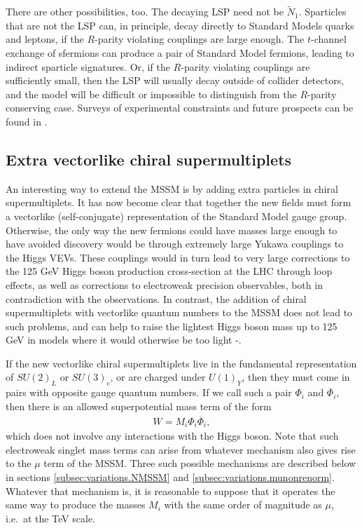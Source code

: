 \documentclass[11pt]{article}
\def\beq{\begin{eqnarray}}
\def\eeq{\end{eqnarray}}
\def\stilde{\widetilde}
\def\NI{\stilde N_1}
\begin{document}
There are other possibilities, too.  The decaying LSP need not be $\NI$.
Sparticles that are not the LSP can, in principle, decay directly to
Standard Models quarks and leptons, if the $R$-parity violating couplings
are large enough. The $t$-channel exchange of sfermions can produce a pair
of Standard Model fermions, leading to indirect sparticle signatures.
Or, if the $R$-parity violating couplings are sufficiently small, then the
LSP will usually decay outside of collider detectors, and the model will
be difficult or impossible to distinguish from the $R$-parity conserving
case. Surveys of experimental constraints and future
prospects can be found in \cite{RPVreviews}. 

\subsection{Extra vectorlike chiral 
supermultiplets}\label{subsec:variations.vectorlike}
\setcounter{equation}{0}

An interesting way to extend the MSSM is by adding extra particles 
in chiral supermultiplets. 
It has now become clear that together 
the new fields must form a vectorlike (self-conjugate) representation 
of the Standard Model gauge group. Otherwise, the only way the new 
fermions could have masses large enough to have avoided discovery would be through
extremely large Yukawa couplings to the Higgs VEVs. 
These couplings would in turn lead to very large 
corrections to the 125 GeV Higgs boson production cross-section at the LHC 
through loop effects, as well as corrections to electroweak precision observables, 
both in contradiction with the observations. In contrast, the addition of
chiral supermultiplets with vectorlike quantum numbers to the MSSM does not lead to such problems, and can help to raise the lightest Higgs boson mass up to 125 GeV
in models where it would otherwise be too light 
\cite{Moroi:1991mg}-\cite{Graham:2009gy}.

If the new vectorlike chiral supermultiplets live in the fundamental representation of 
$SU(2)_L$ or $SU(3)_c$, or are charged under $U(1)_Y$, then they must come in pairs with opposite gauge quantum numbers. 
If we call such a pair 
$\Phi_i$ and $\overline \Phi_i$, then there is an allowed superpotential 
mass term of the form
\beq
W = M_i \Phi_i \overline \Phi_i ,
\label{eq:Wvectorlikemass}
\eeq
which does not involve any interactions with the Higgs boson. Note that 
such electroweak singlet mass terms 
can arise from whatever mechanism also gives rise to the $\mu$ term of the MSSM. Three 
such possible mechanisms are described below in sections \ref{subsec:variations.NMSSM} and
\ref{subsec:variations.munonrenorm}. Whatever that mechanism is, it is 
reasonable to suppose that it operates the same way to produce the masses $M_i$ 
with the same order of magnitude as $\mu$, i.e.~at the TeV scale. 
\end{document}

